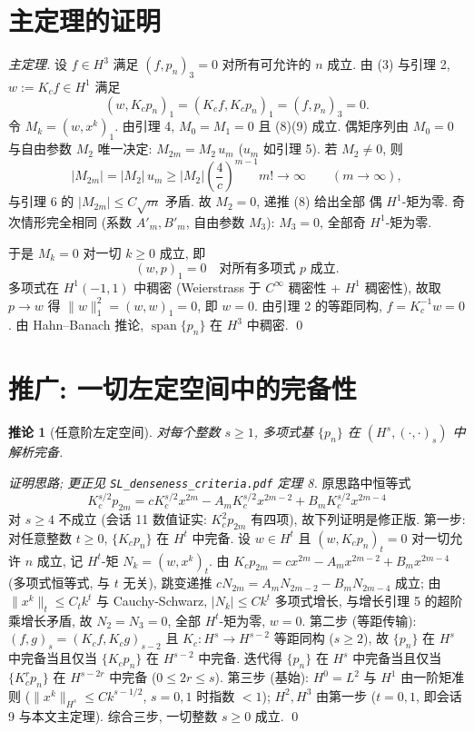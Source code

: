 \documentclass[UTF8]{ctexart}
\newtheorem{corollary}[theorem]{推论}
\begin{document}
\section{主定理的证明}

\begin{proof}[主定理]
设 $f \in H^3$ 满足 $(f, p_n)_3 = 0$ 对所有可允许的 $n$ 成立. 由 (3) 与引理 2,
$w := K_c f \in H^1$ 满足
\[
	(w, K_c p_n)_1 = (K_c f, K_c p_n)_1 = (f, p_n)_3 = 0.
\]
令 $M_k = (w, x^k)_1$. 由引理 4, $M_0 = M_1 = 0$ 且 (8)(9) 成立.
偶矩序列由 $M_0 = 0$ 与自由参数 $M_2$ 唯一决定: $M_{2m} = M_2\, u_m$
($u_m$ 如引理 5). 若 $M_2 \neq 0$, 则
\[
	|M_{2m}| = |M_2|\, u_m \geq |M_2| \left( \frac{4}{c} \right)^{m-1} m! \to \infty
	\qquad (m \to \infty),
\]
与引理 6 的 $|M_{2m}| \leq C\sqrt{m}$ 矛盾. 故 $M_2 = 0$, 递推 (8) 给出全部
偶 $H^1$-矩为零. 奇次情形完全相同 (系数 $A'_m, B'_m$, 自由参数 $M_3$):
$M_3 = 0$, 全部奇 $H^1$-矩为零.

于是 $M_k = 0$ 对一切 $k \geq 0$ 成立, 即
\[
	(w, p)_1 = 0 \quad \text{对所有多项式 } p \text{ 成立}.
\]
多项式在 $H^1(-1,1)$ 中稠密 (Weierstrass 于 $C^\infty$ 稠密性 + $H^1$ 稠密性),
故取 $p \to w$ 得 $\|w\|_1^2 = (w, w)_1 = 0$, 即 $w = 0$. 由引理 2 的等距同构,
$f = K_c^{-1} w = 0$. 由 Hahn--Banach 推论, $\operatorname{span}\{p_n\}$
在 $H^3$ 中稠密. \qed
\end{proof}

\section{推广: 一切左定空间中的完备性}

\begin{corollary}[任意阶左定空间]
对每个整数 $s \geq 1$, 多项式基 $\{p_n\}$ 在 $(H^s, (\cdot,\cdot)_s)$ 中解析完备.
\end{corollary}

\begin{proof}[证明思路; 更正见 \texttt{SL\_denseness\_criteria.pdf} 定理 8]
原思路中恒等式
\[
	K_c^{s/2}p_{2m} = cK_c^{s/2}x^{2m} - A_mK_c^{s/2}x^{2m-2}
		+ B_mK_c^{s/2}x^{2m-4}
\]
对 $s \geq 4$ 不成立 (会话 11 数值证实: $K_c^2p_{2m}$ 有四项),
故下列证明是修正版.
第一步: 对任意整数 $t \geq 0$, $\{K_c p_n\}$ 在 $H^t$ 中完备. 设
$w \in H^t$ 且 $(w, K_c p_n)_t = 0$ 对一切允许 $n$ 成立, 记 $H^t$-矩
$N_k = (w, x^k)_t$. 由 $K_c p_{2m} = cx^{2m} - A_mx^{2m-2} + B_mx^{2m-4}$
(多项式恒等式, 与 $t$ 无关), 跳变递推 $cN_{2m} = A_mN_{2m-2} - B_mN_{2m-4}$
成立; 由 $\|x^k\|_t \leq C_t k^t$ 与 Cauchy-Schwarz, $|N_k| \leq Ck^t$
多项式增长, 与增长引理 5 的超阶乘增长矛盾, 故 $N_2 = N_3 = 0$, 全部
$H^t$-矩为零, $w = 0$.
第二步 (等距传输): $(f,g)_s = (K_c f, K_c g)_{s-2}$ 且 $K_c: H^s \to H^{s-2}$
等距同构 ($s \geq 2$), 故 $\{p_n\}$ 在 $H^s$ 中完备当且仅当 $\{K_c p_n\}$
在 $H^{s-2}$ 中完备. 迭代得 $\{p_n\}$ 在 $H^s$ 中完备当且仅当
$\{K_c^r p_n\}$ 在 $H^{s-2r}$ 中完备 ($0 \leq 2r \leq s$).
第三步 (基始): $H^0 = L^2$ 与 $H^1$ 由一阶矩准则
($\|x^k\|_{H^s} \leq Ck^{s-1/2}$, $s = 0, 1$ 时指数 $< 1$); $H^2, H^3$
由第一步 ($t = 0, 1$, 即会话 9 与本文主定理). 综合三步, 一切整数
$s \geq 0$ 成立. \qed
\end{proof}
\end{document}
